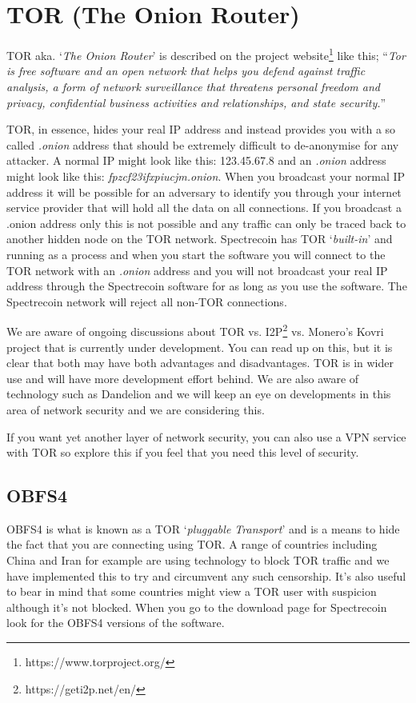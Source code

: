 \chapter{TOR (The Onion Router)}
TOR aka. ‘\textit{The Onion Router}’ is described on the project
website\footnote{https://www.torproject.org/ } like this; “\textit{Tor is 
free software and an open network that helps you defend against traffic 
analysis, a form of network surveillance that threatens personal freedom 
and privacy, confidential business activities and relationships, and 
state security.}” 



TOR, in essence, hides your real IP address and instead provides you with 
a so called \textit{.onion} address that should be extremely difficult to 
de-anonymise for any attacker. A normal IP might look like this: 123.45.67.8 
and an \textit{.onion} address might look like this: 
\textit{fpzcf23ifxpiucjm.onion}. When you broadcast your normal IP address 
it will be possible for an adversary to identify you through your internet 
service provider that will hold all the data on all connections. If you 
broadcast a .onion address only this is not possible and any traffic can 
only be traced back to another hidden node on the TOR network. Spectrecoin 
has TOR ‘\textit{built-in}’ and running as a process and when you start the 
software you will connect to the TOR network with an \textit{.onion} address 
and you will not broadcast your real IP address through the Spectrecoin 
software for as long as you use the software. The Spectrecoin network will 
reject all non-TOR connections. 



We are aware of ongoing discussions about TOR vs. I2P\footnote{https://geti2p.net/en/} 
vs. Monero’s Kovri project that is currently under development. You can 
read up on this, but it is clear that both may have both advantages and 
disadvantages. TOR is in wider use and will have more development effort 
behind. We are also aware of technology such as Dandelion and we will keep 
an eye on developments in this area of network security and we are 
considering this. 



If you want yet another layer of network security, you can also use a VPN 
service with TOR so explore this if you feel that you need this level of 
security. 


\section{OBFS4}
OBFS4 is what is known as a TOR ‘\textit{pluggable Transport}’ and is a 
means to hide the fact that you are connecting using TOR. A range of 
countries including China and Iran for example are using technology to 
block TOR traffic and we have implemented this to try and circumvent any 
such censorship. It’s also useful to bear in mind that some countries might 
view a TOR user with suspicion although it’s not blocked. When you go to 
the download page for Spectrecoin look for the OBFS4 versions of the 
software. 



